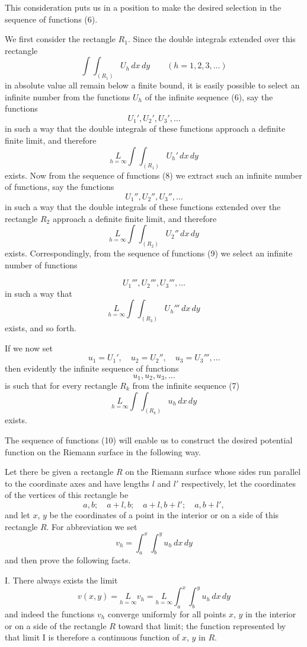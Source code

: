 \documentclass{article}
\begin{document}
This consideration puts us in a position to make the desired selection in the sequence of functions (6).

We first consider the rectangle $R_1$. Since the double integrals extended over this rectangle
\[
\int\!\!\int_{(R_1)} U_h\,dx\,dy \qquad (h = 1, 2, 3, \dots)
\]
in absolute value all remain below a finite bound, it is easily possible to select an infinite number from the functions $U_h$ of the infinite sequence (6), say the functions
\[
U_1', U_2', U_3', \dots \tag{8}
\]
in such a way that the double integrals of these functions approach a definite finite limit, and therefore
\[
\underset{h=\infty}{L} \int\!\!\int_{(R_1)} U_h'\,dx\,dy
\]
exists. Now from the sequence of functions (8) we extract such an infinite number of functions, say the functions
\[
U_1'', U_2'', U_3'', \dots \tag{9}
\]
in such a way that the double integrals of these functions extended over the rectangle $R_2$ approach a definite finite limit, and therefore
\[
\underset{h=\infty}{L} \int\!\!\int_{(R_2)} U_2''\,dx\,dy
\]
exists. Correspondingly, from the sequence of functions (9) we select an infinite number of functions

\[
U_1''', U_2''', U_3''', \dots
\]
in such a way that
\[
\underset{h=\infty}{L} \int\!\!\int_{(R_3)} U_h'''\,dx\,dy
\]
exists, and so forth.

If we now set
\[
u_1 = U_1', \quad u_2 = U_2'', \quad u_3 = U_3''', \dots
\]
then evidently the infinite sequence of functions
\[
u_1, u_2, u_3, \dots \tag{10}
\]
is such that for every rectangle $R_k$ from the infinite sequence (7)
\[
\underset{h=\infty}{L} \int\!\!\int_{(R_k)} u_h\,dx\,dy
\]
exists.

The sequence of functions (10) will enable us to construct the desired potential function on the Riemann surface in the following way.

Let there be given a rectangle $R$ on the Riemann surface whose sides run parallel to the coordinate axes and have lengths $l$ and $l'$ respectively, let the coordinates of the vertices of this rectangle be
\[
a, b; \quad a+l, b; \quad a+l, b+l'; \quad a, b+l',
\]
and let $x$, $y$ be the coordinates of a point in the interior or on a side of this rectangle $R$. For abbreviation we set
\[
v_h = \int_a^x \int_b^y u_h\,dx\,dy
\]
and then prove the following facts.

I. There always exists the limit
\[
v(x, y) = \underset{h=\infty}{L} v_h = \underset{h=\infty}{L} \int_a^x \int_b^y u_h\,dx\,dy \tag{I}
\]
and indeed the functions $v_h$ converge uniformly for all points $x$, $y$ in the interior or on a side of the rectangle $R$ toward that limit; the function represented by that limit I is therefore a continuous function of $x$, $y$ in $R$.
\end{document}
